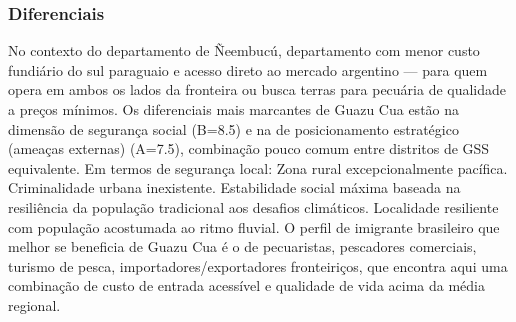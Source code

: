 \subsubsection*{Diferenciais}\label{dif-guazu-cua-1206}
No contexto do departamento de Ñeembucú, departamento com menor custo fundiário do sul paraguaio e acesso direto ao mercado argentino — para quem opera em ambos os lados da fronteira ou busca terras para pecuária de qualidade a preços mínimos. Os diferenciais mais marcantes de Guazu Cua estão na dimensão de segurança social (B=8.5) e na de posicionamento estratégico (ameaças externas) (A=7.5), combinação pouco comum entre distritos de GSS equivalente. Em termos de segurança local: Zona rural excepcionalmente pacífica. Criminalidade urbana inexistente. Estabilidade social máxima baseada na resiliência da população tradicional aos desafios climáticos. Localidade resiliente com população acostumada ao ritmo fluvial. O perfil de imigrante brasileiro que melhor se beneficia de Guazu Cua é o de pecuaristas, pescadores comerciais, turismo de pesca, importadores/exportadores fronteiriços, que encontra aqui uma combinação de custo de entrada acessível e qualidade de vida acima da média regional.
